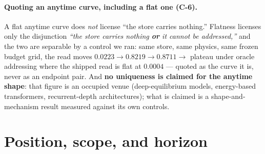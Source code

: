 \documentclass[11pt]{article}
\begin{document}
\paragraph{Quoting an anytime curve, including a flat one (C-6).} A flat anytime curve does \emph{not} license ``the store carries nothing.'' Flatness licenses only the disjunction \emph{``the store carries nothing \textbf{or} it cannot be addressed,''} and the two are separable by a control we ran: same store, same physics, same frozen budget grid, the read moves $0.0223\to0.8219\to0.8711\to$ plateau under oracle addressing where the shipped read is flat at $0.0004$ --- quoted as the curve it is, never as an endpoint pair. And \textbf{no uniqueness is claimed for the anytime shape}: that figure is an occupied venue (deep-equilibrium models, energy-based transformers, recurrent-depth architectures); what is claimed is a shape-and-mechanism result measured against its own controls.

\section{Position, scope, and horizon}
\end{document}

